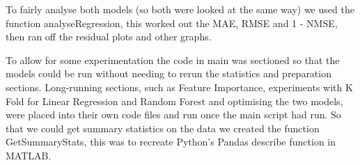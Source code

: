 \documentclass[a4pape, 11pt, english]{article}
\begin{document}
To fairly analyse both models (so both were looked at the same way) we used the function analyseRegression, this worked out the MAE, RMSE and 1 - NMSE, then ran off the residual plots and other graphs.

To allow for some experimentation the code in main was sectioned so that the models could be run without needing to rerun the statistics and preparation sections. Long-running sections, such as Feature Importance, experiments with K Fold for Linear Regression and Random Forest and optimising the two models, were placed into their own code files and run once the main script had run.
So that we could get summary statistics on the data we created the function GetSummaryStats, this was to recreate Python's Pandas describe function in MATLAB. 




\end{document}
